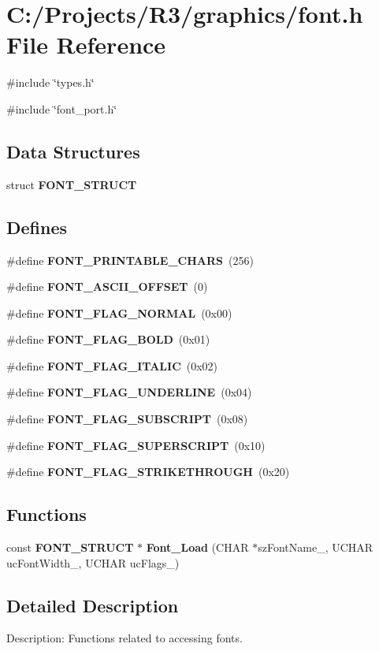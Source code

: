 \section{C:/Projects/R3/graphics/font.h File Reference}
\label{font_8h}
{\ttfamily \#include \char`\"{}types.h\char`\"{}}\par
{\ttfamily \#include \char`\"{}font\_\-port.h\char`\"{}}\par
\subsection*{Data Structures}
\begin{DoxyCompactItemize}
\item 
struct {\bf FONT\_\-STRUCT}
\end{DoxyCompactItemize}
\subsection*{Defines}
\begin{DoxyCompactItemize}
\item 
\#define {\bf FONT\_\-PRINTABLE\_\-CHARS}~(256)
\item 
\#define {\bf FONT\_\-ASCII\_\-OFFSET}~(0)
\item 
\#define {\bf FONT\_\-FLAG\_\-NORMAL}~(0x00)
\item 
\#define {\bf FONT\_\-FLAG\_\-BOLD}~(0x01)
\item 
\#define {\bf FONT\_\-FLAG\_\-ITALIC}~(0x02)
\item 
\#define {\bf FONT\_\-FLAG\_\-UNDERLINE}~(0x04)
\item 
\#define {\bf FONT\_\-FLAG\_\-SUBSCRIPT}~(0x08)
\item 
\#define {\bf FONT\_\-FLAG\_\-SUPERSCRIPT}~(0x10)
\item 
\#define {\bf FONT\_\-FLAG\_\-STRIKETHROUGH}~(0x20)
\end{DoxyCompactItemize}
\subsection*{Functions}
\begin{DoxyCompactItemize}
\item 
const {\bf FONT\_\-STRUCT} $\ast$ {\bf Font\_\-Load} (CHAR $\ast$szFontName\_\-, UCHAR ucFontWidth\_\-, UCHAR ucFlags\_\-)
\end{DoxyCompactItemize}


\subsection{Detailed Description}
Description: Functions related to accessing fonts. 


